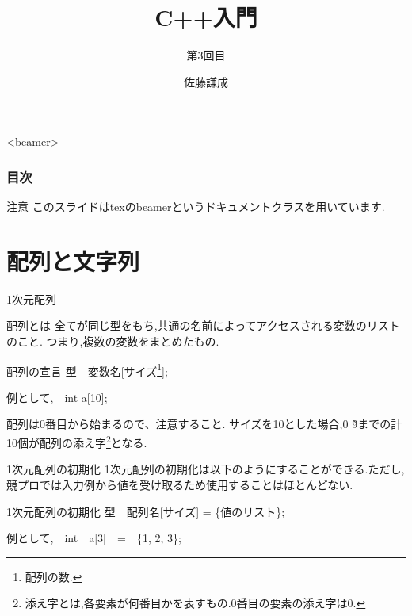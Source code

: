 \documentclass[xdvipdfmx, 8pt, t]{beamer}
\title{C++入門}
\subtitle{第3回目}
\author{佐藤謙成}
\begin{document}
\begin{frame}
    \titlepage
\end{frame}

\begin{frame}<beamer>
\frametitle{目次}
    \tableofcontents[]
\end{frame}

\begin{frame}{注意}
    このスライドはtexのbeamerというドキュメントクラスを用いています.
\end{frame}

\section{配列と文字列}
\begin{frame}{1次元配列}
    \begin{block}{配列とは}
        全てが同じ型をもち,共通の名前によってアクセスされる変数のリストのこと.
        つまり,複数の変数をまとめたもの.
    \end{block}
    \begin{block}{配列の宣言}
        型　変数名[サイズ\footnote{配列の数.}]; 
        
        例として,　int a[10];
    \end{block}
    \begin{alertblock}{}
        配列は0番目から始まるので、注意すること.
        サイズを10とした場合,0 \~ 9までの計10個が配列の添え字\footnote{添え字とは,各要素が何番目かを表すもの.0番目の要素の添え字は0.}となる.
    \end{alertblock}
\end{frame}

\begin{frame}{1次元配列の初期化}
1次元配列の初期化は以下のようにすることができる.ただし,競プロでは入力例から値を受け取るため使用することはほとんどない.
\begin{block}{1次元配列の初期化}
    型　配列名[サイズ] = \{値のリスト\};
    
    例として,　int　a[3]　=　\{1, 2, 3\};
    
\end{block}
\end{frame}
\end{document}
